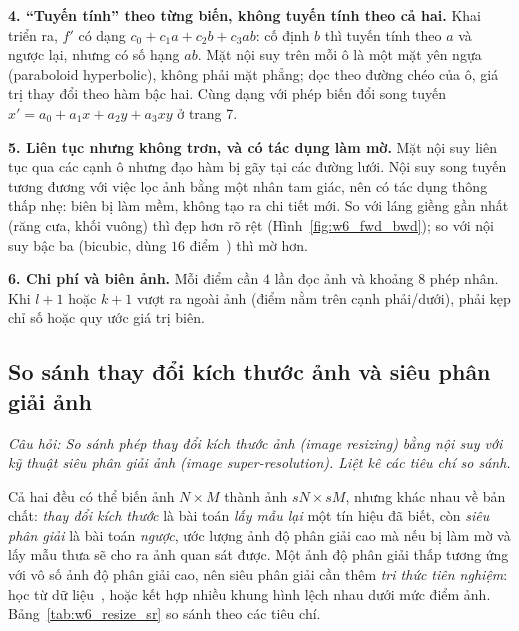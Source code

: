 \textbf{4. ``Tuyến tính'' theo từng biến, không tuyến tính theo cả hai.} Khai triển ra, $f'$ có dạng $c_0 + c_1 a + c_2 b + c_3 ab$: cố định $b$ thì tuyến tính theo $a$ và ngược lại, nhưng có số hạng $ab$. Mặt nội suy trên mỗi ô là một mặt yên ngựa (paraboloid hyperbolic), không phải mặt phẳng; dọc theo đường chéo của ô, giá trị thay đổi theo hàm bậc hai. Cùng dạng với phép biến đổi song tuyến $x' = a_0 + a_1 x + a_2 y + a_3 xy$ ở trang 7.

\textbf{5. Liên tục nhưng không trơn, và có tác dụng làm mờ.} Mặt nội suy liên tục qua các cạnh ô nhưng đạo hàm bị gãy tại các đường lưới. Nội suy song tuyến tương đương với việc lọc ảnh bằng một nhân tam giác, nên có tác dụng thông thấp nhẹ: biên bị làm mềm, không tạo ra chi tiết mới. So với láng giềng gần nhất (răng cưa, khối vuông) thì đẹp hơn rõ rệt (Hình~\ref{fig:w6_fwd_bwd}); so với nội suy bậc ba (bicubic, dùng $16$ điểm~\citep{keys1981cubic}) thì mờ hơn.

\textbf{6. Chi phí và biên ảnh.} Mỗi điểm cần $4$ lần đọc ảnh và khoảng $8$ phép nhân. Khi $l + 1$ hoặc $k + 1$ vượt ra ngoài ảnh (điểm nằm trên cạnh phải/dưới), phải kẹp chỉ số hoặc quy ước giá trị biên.

\subsection{So sánh thay đổi kích thước ảnh và siêu phân giải ảnh}
\label{subsec:w6_resize_vs_sr}

\textit{Câu hỏi: So sánh phép thay đổi kích thước ảnh (image resizing) bằng nội suy với kỹ thuật siêu phân giải ảnh (image super-resolution). Liệt kê các tiêu chí so sánh.}

Cả hai đều có thể biến ảnh $N \times M$ thành ảnh $sN \times sM$, nhưng khác nhau về bản chất: \emph{thay đổi kích thước} là bài toán \emph{lấy mẫu lại} một tín hiệu đã biết, còn \emph{siêu phân giải} là bài toán \emph{ngược}, ước lượng ảnh độ phân giải cao mà nếu bị làm mờ và lấy mẫu thưa sẽ cho ra ảnh quan sát được. Một ảnh độ phân giải thấp tương ứng với vô số ảnh độ phân giải cao, nên siêu phân giải cần thêm \emph{tri thức tiên nghiệm}: học từ dữ liệu~\citep{dong2016image,ledig2017photo}, hoặc kết hợp nhiều khung hình lệch nhau dưới mức điểm ảnh. Bảng~\ref{tab:w6_resize_sr} so sánh theo các tiêu chí.


